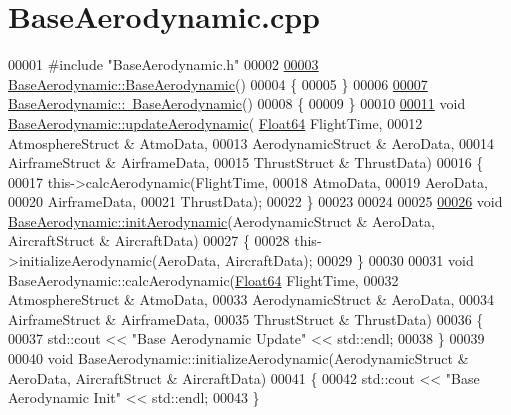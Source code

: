 \hypertarget{_base_aerodynamic_8cpp_source}{}\section{Base\+Aerodynamic.\+cpp}
\label{_base_aerodynamic_8cpp_source}

\begin{DoxyCode}
00001 \textcolor{preprocessor}{#include "BaseAerodynamic.h"}
00002 
\hyperlink{group___aerodynamic_aa05d0598119b1364cdb45cf478ae578c}{00003} \hyperlink{group___aerodynamic_aa05d0598119b1364cdb45cf478ae578c}{BaseAerodynamic::BaseAerodynamic}()
00004 \{
00005 \}
00006 
\hyperlink{group___aerodynamic_a81d08f3a779e6e25245b6f3b545920cb}{00007} \hyperlink{group___aerodynamic_a81d08f3a779e6e25245b6f3b545920cb}{BaseAerodynamic::~BaseAerodynamic}()
00008 \{
00009 \}
00010 
\hyperlink{group___aerodynamic_a6354f3c8433c7a2235041f843d4fe10e}{00011} \textcolor{keywordtype}{void} \hyperlink{group___aerodynamic_a6354f3c8433c7a2235041f843d4fe10e}{BaseAerodynamic::updateAerodynamic}(
      \hyperlink{group___tools_ga3f1431cb9f76da10f59246d1d743dc2c}{Float64} FlightTime, 
00012                                         AtmosphereStruct & AtmoData, 
00013                                         AerodynamicStruct & AeroData, 
00014                                         AirframeStruct & AirframeData, 
00015                                         ThrustStruct & ThrustData)
00016 \{
00017     this->calcAerodynamic(FlightTime,
00018                         AtmoData,
00019                         AeroData,
00020                         AirframeData,
00021                         ThrustData);
00022 \}
00023 
00024 
00025 
\hyperlink{group___aerodynamic_a5ea58755a40507d217848efb151879c8}{00026} \textcolor{keywordtype}{void} \hyperlink{group___aerodynamic_a5ea58755a40507d217848efb151879c8}{BaseAerodynamic::initAerodynamic}(AerodynamicStruct & AeroData, 
      AircraftStruct & AircraftData)
00027 \{
00028     this->initializeAerodynamic(AeroData, AircraftData);
00029 \}
00030 
00031 \textcolor{keywordtype}{void} BaseAerodynamic::calcAerodynamic(\hyperlink{group___tools_ga3f1431cb9f76da10f59246d1d743dc2c}{Float64} FlightTime,
00032                                       AtmosphereStruct & AtmoData, 
00033                                       AerodynamicStruct & AeroData,
00034                                       AirframeStruct & AirframeData,
00035                                       ThrustStruct & ThrustData)
00036 \{
00037     std::cout << \textcolor{stringliteral}{"Base Aerodynamic Update"} << std::endl;
00038 \}
00039 
00040 \textcolor{keywordtype}{void} BaseAerodynamic::initializeAerodynamic(AerodynamicStruct & AeroData, AircraftStruct & AircraftData)
00041 \{
00042     std::cout << \textcolor{stringliteral}{"Base Aerodynamic Init"} << std::endl;
00043 \}
\end{DoxyCode}
